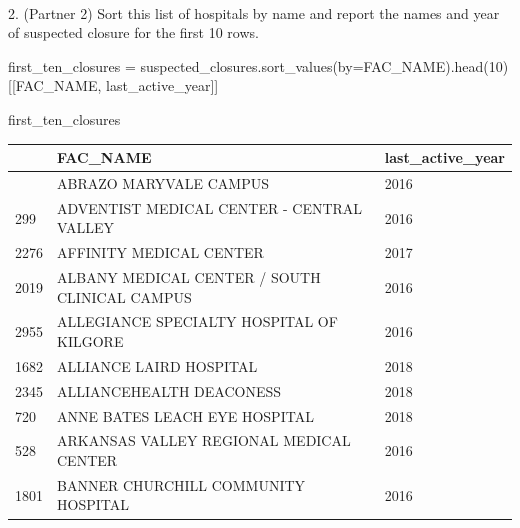\documentclass[
  letterpaper,
  DIV=11,
  numbers=noendperiod]{scrartcl}
\makeatletter
\let\oldparagraph\paragraph
\renewcommand{\paragraph}{
    \@ifstar
      \xxxParagraphStar
      \xxxParagraphNoStar
  }
\newcommand{\xxxParagraphStar}[1]{\oldparagraph*{#1}\mbox{}}
\newcommand{\xxxParagraphNoStar}[1]{\oldparagraph{#1}\mbox{}}
\newenvironment{Shaded}{\begin{snugshade}}{\end{snugshade}}
\newcommand{\DecValTok}[1]{\textcolor[rgb]{0.68,0.00,0.00}{#1}}
\newcommand{\NormalTok}[1]{\textcolor[rgb]{0.00,0.23,0.31}{#1}}
\newcommand{\OperatorTok}[1]{\textcolor[rgb]{0.37,0.37,0.37}{#1}}
\newcommand{\StringTok}[1]{\textcolor[rgb]{0.13,0.47,0.30}{#1}}
\makeatother
\begin{document}
\paragraph{2. (Partner 2) Sort this list of hospitals by name and report
the names and year of suspected closure for the first 10
rows.}\label{partner-2-sort-this-list-of-hospitals-by-name-and-report-the-names-and-year-of-suspected-closure-for-the-first-10-rows.}

\begin{Shaded}
\begin{Highlighting}[]
\NormalTok{first\_ten\_closures }\OperatorTok{=}\NormalTok{ suspected\_closures.sort\_values(by}\OperatorTok{=}\StringTok{\textquotesingle{}FAC\_NAME\textquotesingle{}}\NormalTok{).head(}\DecValTok{10}\NormalTok{)[[}\StringTok{\textquotesingle{}FAC\_NAME\textquotesingle{}}\NormalTok{, }\StringTok{\textquotesingle{}last\_active\_year\textquotesingle{}}\NormalTok{]]}

\NormalTok{first\_ten\_closures}
\end{Highlighting}
\end{Shaded}

\begin{longtable}[]{@{}lll@{}}
\toprule\noalign{}
& FAC\_NAME & last\_active\_year \\
\midrule\noalign{}
\endhead
\bottomrule\noalign{}
\endlastfoot
93 & ABRAZO MARYVALE CAMPUS & 2016 \\
299 & ADVENTIST MEDICAL CENTER - CENTRAL VALLEY & 2016 \\
2276 & AFFINITY MEDICAL CENTER & 2017 \\
2019 & ALBANY MEDICAL CENTER / SOUTH CLINICAL CAMPUS & 2016 \\
2955 & ALLEGIANCE SPECIALTY HOSPITAL OF KILGORE & 2016 \\
1682 & ALLIANCE LAIRD HOSPITAL & 2018 \\
2345 & ALLIANCEHEALTH DEACONESS & 2018 \\
720 & ANNE BATES LEACH EYE HOSPITAL & 2018 \\
528 & ARKANSAS VALLEY REGIONAL MEDICAL CENTER & 2016 \\
1801 & BANNER CHURCHILL COMMUNITY HOSPITAL & 2016 \\
\end{longtable}
\end{document}
